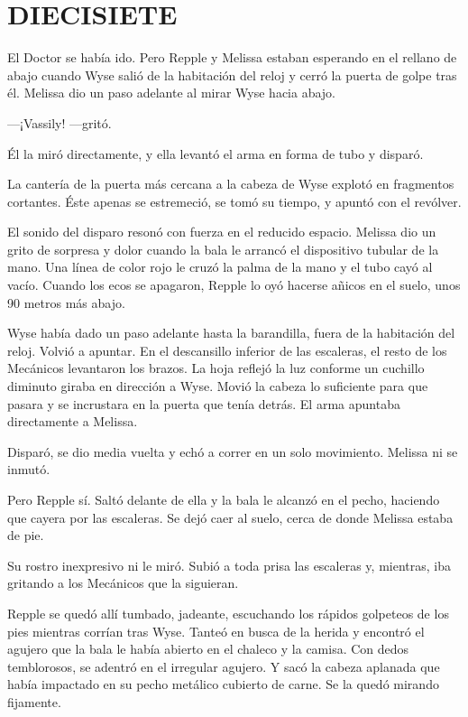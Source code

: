 \chapter*{DIECISIETE}

{El Doctor se había ido. Pero Repple y Melissa estaban esperando en el
	rellano de abajo cuando Wyse salió de la habitación del reloj y cerró la
	puerta de golpe tras él. Melissa dio un paso adelante al mirar Wyse
hacia abajo.}

{---¡Vassily! ---gritó.}

{Él la miró directamente, y ella levantó el arma en forma de tubo y
disparó.}

{La cantería de la puerta más cercana a la cabeza de Wyse explotó en
	fragmentos cortantes. Éste apenas se estremeció, se tomó su tiempo, y
apuntó con el revólver.}

{El sonido del disparo resonó con fuerza en el reducido espacio. Melissa
	dio un grito de sorpresa y dolor cuando la bala le arrancó el
	dispositivo tubular de la mano. Una línea de color rojo le cruzó la
	palma de la mano y el tubo cayó al vacío. Cuando los ecos se apagaron,
Repple lo oyó hacerse añicos en el suelo, unos 90 metros más abajo.}

{Wyse había dado un paso adelante hasta la barandilla, fuera de la
	habitación del reloj. Volvió a apuntar. En el descansillo inferior de
	las escaleras, el resto de los Mecánicos levantaron los brazos. La hoja
	reflejó la luz conforme un cuchillo diminuto giraba en dirección a Wyse.
	Movió la cabeza lo suficiente para que pasara y se incrustara en la
puerta que tenía detrás. El arma apuntaba directamente a Melissa.}

{Disparó, se dio media vuelta y echó a correr en un solo movimiento.
Melissa ni se inmutó.}

{Pero Repple sí. Saltó delante de ella y la bala le alcanzó en el pecho,
	haciendo que cayera por las escaleras. Se dejó caer al suelo, cerca de
donde Melissa estaba de pie.}

{Su rostro inexpresivo ni le miró. Subió a toda prisa las escaleras y,
mientras, iba gritando a los Mecánicos que la siguieran.}

{Repple se quedó allí tumbado, jadeante, escuchando los rápidos
	golpeteos de los pies mientras corrían tras Wyse. Tanteó en busca de la
	herida y encontró el agujero que la bala le había abierto en el chaleco
	y la camisa. Con dedos temblorosos, se adentró en el irregular agujero.
	Y sacó la cabeza aplanada que había impactado en su pecho metálico
cubierto de carne. Se la quedó mirando fijamente.}


